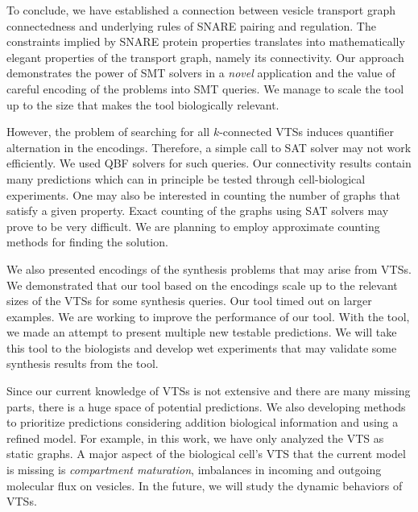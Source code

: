 To conclude, we have established a connection between vesicle transport graph connectedness and underlying rules of SNARE pairing and regulation. 
%
The constraints implied by SNARE protein properties translates into
mathematically elegant properties of the transport graph, namely its connectivity.
%
Our approach demonstrates the power of SMT solvers in a {\em novel} application and the value of careful encoding of the problems into SMT queries. 
We manage to scale the tool up to the size that makes the tool biologically relevant.
%

However, the problem of searching for all $k$-connected VTSs induces quantifier alternation in the encodings.
%
Therefore, a simple call to SAT solver may not work efficiently. 
%
We used QBF solvers for such queries.
%
Our connectivity results contain many predictions which can in principle be tested through cell-biological experiments. 
%
One may also be interested in counting the number of graphs that satisfy
a given property. 
%
Exact counting of the graphs using SAT solvers may prove to be very
difficult. 
%
We are planning to employ approximate counting methods for finding the solution.
%

We also presented encodings of the synthesis problems that may arise from VTSs.
%
We demonstrated that our tool based on the encodings
scale up to the relevant sizes of the VTSs for some synthesis queries.
%
Our tool timed out on larger examples.
%
We are working to improve the performance of our tool.
%
%
With the tool, we made an attempt to present multiple new testable predictions. 
%
We will take this tool to the biologists and develop wet experiments that may
validate some synthesis results from the tool.
%
%

Since our current knowledge of VTSs is not extensive and there are many missing parts,
there is a huge space of potential predictions.
%
We also developing methods to prioritize predictions considering addition biological
information and using a refined model.
%
For example, in this work, we have only analyzed the VTS as static graphs. A major aspect of the biological cell’s VTS that the current model is missing is \textit{compartment maturation}, imbalances in incoming and outgoing molecular flux on vesicles.
%
In the future, we will study the dynamic behaviors of VTSs.

